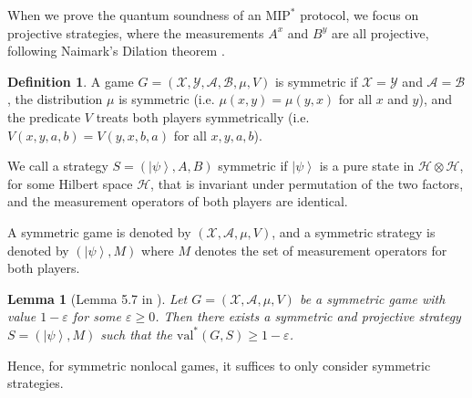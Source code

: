 \documentclass[10pt,a4paper]{article}
\theoremstyle{plain}
\newtheorem{lemma}[theorem]{Lemma}
\theoremstyle{definition}
\newtheorem{definition}[theorem]{Definition}
\newcommand {\ket} [1] {\ensuremath{ \left| #1 \right\rangle }}
\newcommand{\ep} {\ensuremath{\varepsilon}}
\newcommand{\x}{\otimes}
\newcommand{\calH}{\mathcal{H}}
\newcommand{\calX}{\mathcal{X}}
\newcommand{\calY}{\mathcal{Y}}
\newcommand{\calA}{\mathcal{A}}
\newcommand{\calB}{\mathcal{B}}
\newcommand{\1}{\mathbb{1}} %
\newcommand{\MIP}{\mathrm{MIP}}
\newcommand{\val}{\mathrm{val}}
\begin{document}
When we prove the quantum soundness of an $\MIP^\ast$ protocol, we focus on projective strategies, where the measurements
$A^x$ and $B^y$ are all projective, following Naimark's Dilation theorem \cite[Theorem 5.1]{JNVWYuen'20}.
\begin{definition}
    A game $G = (\calX, \calY, \calA, \calB, \mu, V)$ is symmetric if $\calX = \calY$ and $\calA = \calB$, the distribution $\mu$
    is symmetric (i.e. $\mu(x,y) = \mu(y,x)$ for all $x$ and $y$), and the predicate $V$ treats both players symmetrically (i.e. 
    $V(x,y,a,b) = V(y,x,b,a)$ for all $x,y,a,b$).

    We call a strategy $S = (\ket{\psi}, A, B)$ symmetric if $\ket{\psi}$ is a pure state in $\calH \x \calH$, for some Hilbert space $\calH$, that is invariant under permutation of the two factors, and the measurement operators of both players are identical. 
\end{definition}
A symmetric game is denoted by $(\calX, \calA, \mu, V)$, and a symmetric strategy is denoted by $(\ket{\psi}, M)$
where $M$ denotes the set of measurement operators for both players.
\begin{lemma}[Lemma 5.7 in \cite{JNVWY'20}]
    Let $G = (\calX, \calA, \mu, V)$ be a symmetric game with value $1 - \ep$ for some $\ep \geq 0$.
    Then there exists a symmetric and projective strategy $S = (\ket{\psi}, M)$ such that the $\val^\ast(G,S)\geq 1- \ep$.
\end{lemma}
Hence, for symmetric nonlocal games, it suffices to only consider symmetric strategies.

\end{document}
